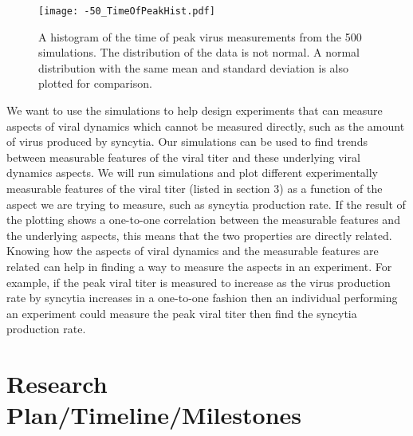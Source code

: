 \documentclass[a4paper]{article}
\begin{document}
\begin{figure}[h]
    \centering
    \texttt{[image: -50\_TimeOfPeakHist.pdf]}
    \caption{A histogram of the time of peak virus measurements from the 500 simulations.  The distribution of the data is not normal. A normal distribution with the same mean and standard deviation is also plotted for comparison.}
    \label{fig:Hist}
\end{figure}


We want to use the simulations to help design experiments that can measure aspects of viral dynamics which cannot be measured directly, such as the amount of virus produced by syncytia. Our simulations can be used to find trends between measurable features of the viral titer and these underlying viral dynamics aspects. We will run simulations and plot different experimentally measurable features of the viral titer (listed in section 3) as a function of the aspect we are trying to measure, such as syncytia production rate. If the result of the plotting shows a one-to-one correlation between the measurable features and the underlying aspects, this means that the two properties are directly related. Knowing how the aspects of viral dynamics and the measurable features are related can help in finding a way to measure the aspects in an experiment. For example, if the peak viral titer is measured to increase as the virus production rate by syncytia increases in a one-to-one fashion then an individual performing an experiment could measure the peak viral titer then find the syncytia production rate.

\section{Research Plan/Timeline/Milestones}
\end{document}
